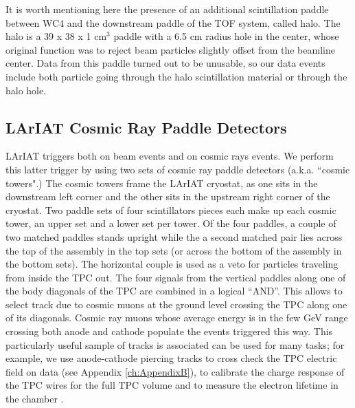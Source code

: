 It is worth mentioning here the presence of an additional scintillation paddle between WC4 and the downstream paddle of the TOF system, called halo. The halo is a 39 x 38 x 1 cm$^3$ paddle with a 6.5 cm radius hole in the center, whose original function was to reject  beam particles slightly offset from the beamline center. Data from this paddle turned out to be unusable, so our data events include both particle going through the halo scintillation material or through the halo hole.

\subsection{LArIAT Cosmic Ray Paddle Detectors}\label{sec:CosmicRayPaddle}
LArIAT triggers both on beam events and on cosmic rays events. We perform this latter trigger by using two sets of cosmic ray paddle detectors (a.k.a. ``cosmic towers".) The cosmic towers frame the LArIAT cryostat, as one sits in the downstream left corner and the other sits in the upstream right corner of the cryostat. Two paddle sets of four scintillators pieces each make up each cosmic tower, an upper set and a lower set per tower. 
Of the four paddles, a couple of two matched paddles stands upright while the a second matched pair lies across the top of the assembly in the top sets (or across the bottom of the assembly in the bottom sets). The horizontal couple is used as a veto for particles traveling from inside the TPC out.  The four signals  from the vertical paddles along one of the body diagonals of the TPC are combined in a logical ``AND''. This allows to select track due to cosmic muons at the ground level crossing the TPC along one of its diagonals.  Cosmic ray muons whose average energy is in the few GeV range crossing both anode and cathode populate the events triggered this way. This particularly useful sample of tracks is associated can be used for many tasks; for example, we use anode-cathode piercing tracks to cross check the TPC electric field on data (see Appendix \ref{ch:AppendixB}), to calibrate the charge response of the TPC wires for the full TPC volume and to measure the electron lifetime in the chamber \cite{LArIATLifeTime}.

